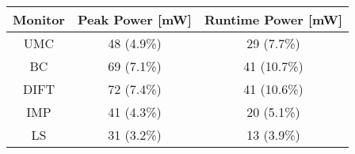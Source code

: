 

\begin{tabular}{|c|c|c|}
\hline

{\bf Monitor} & {\bf Peak Power [mW]} & {\bf Runtime Power [mW]} \\ \hline\hline

UMC  & 48 (4.9\%) & 29 (7.7\%) \\ \hline
BC   & 69 (7.1\%) & 41 (10.7\%) \\ \hline
DIFT & 72 (7.4\%) & 41 (10.6\%) \\ \hline
IMP  & 41 (4.3\%) & 20 (5.1\%) \\ \hline
LS   & 31 (3.2\%) & 13 (3.9\%) \\ \hline

\end{tabular}

